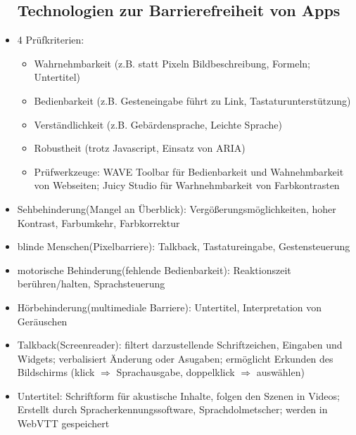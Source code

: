 \documentclass[12pt,landscape]{article}
\begin{document}
\begin{multicols}{3}
\begin{itemize}
\subsection{Technologien zur Barrierefreiheit von Apps}
\item 4 Prüfkriterien:
\begin{itemize}
    \item Wahrnehmbarkeit (z.B. statt Pixeln Bildbeschreibung, Formeln; Untertitel)
    \item Bedienbarkeit (z.B. Gesteneingabe führt zu Link, Tastaturunterstützung)
    \item Verständlichkeit (z.B. Gebärdensprache, Leichte Sprache)
    \item Robustheit (trotz Javascript, Einsatz von ARIA)
    \item Prüfwerkzeuge: WAVE Toolbar für Bedienbarkeit und Wahnehmbarkeit von Webseiten; Juicy Studio für Warhnehmbarkeit von Farbkontrasten
\end{itemize}
\item Sehbehinderung(Mangel an Überblick): Vergößerungsmöglichkeiten, hoher Kontrast, Farbumkehr, Farbkorrektur
\item blinde Menschen(Pixelbarriere): Talkback, Tastatureingabe, Gestensteuerung
\item motorische Behinderung(fehlende Bedienbarkeit): Reaktionszeit berühren/halten, Sprachsteuerung
\item Hörbehinderung(multimediale Barriere): Untertitel, Interpretation von Geräuschen
\item Talkback(Screenreader): filtert darzustellende Schriftzeichen, Eingaben und Widgets; verbalisiert Änderung oder Asugaben; ermöglicht Erkunden des Bildschirms (klick $\Rightarrow$ Sprachausgabe, doppelklick $\Rightarrow$ auswählen)
\item Untertitel: Schriftform für akustische Inhalte, folgen den Szenen in Videos; Erstellt durch Spracherkennungssoftware, Sprachdolmetscher; werden in WebVTT gespeichert

\end{itemize}
\end{multicols}
\end{document}
